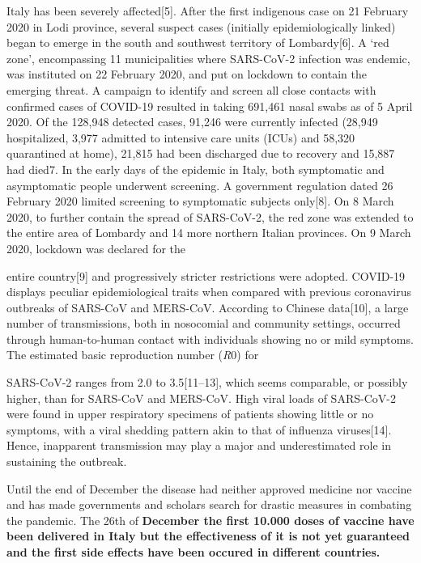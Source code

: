 \documentclass[a4paper]{article}
\begin{document}
\textcolor[rgb]{0.07450981,0.078431375,0.07450981}{Italy has been severely affected[5]. After the first indigenous case
on 21 February 2020 in Lodi province, several suspect cases (initially epidemiologically linked) began to emerge in the
south and southwest territory of Lombardy[6]. A ‘red zone’, encompassing 11 municipalities where SARS-CoV-2 infection
was endemic, was instituted on 22 February 2020, and put on lockdown to contain the emerging threat. A campaign to
identify and screen all close contacts with confirmed cases of COVID-19 resulted in taking 691,461 nasal swabs as of 5
April 2020. Of the 128,948 detected cases, 91,246 were currently infected (28,949 hospitalized, 3,977 admitted to
intensive care units (ICUs) and 58,320 quarantined at home), 21,815 had been discharged due to recovery and 15,887 had
died7. In the early days of the epidemic in Italy, both symptomatic and asymptomatic people underwent screening. A
government regulation dated 26 February 2020 limited screening to symptomatic subjects only[8]. On 8 March 2020, to
further contain the spread of SARS-CoV-2, the red zone was extended to the entire area of Lombardy and 14 more northern
Italian provinces. On 9 March 2020, lockdown was declared for the}

\textcolor[rgb]{0.07450981,0.078431375,0.07450981}{entire country[9] and progressively stricter restrictions were
adopted. COVID-19 displays peculiar epidemiological traits when compared with previous coronavirus outbreaks of
SARS-CoV and }\textcolor[rgb]{0.07450981,0.078431375,0.07450981}{MERS-CoV. According to Chinese data[10], a large
number of transmissions, both in nosocomial and community settings, occurred through human-to-human contact with
individuals showing no or mild symptoms. The estimated basic reproduction number
(}\textit{\textcolor[rgb]{0.07450981,0.078431375,0.07450981}{R}}\textcolor[rgb]{0.07450981,0.078431375,0.07450981}{0)
for}

\textcolor[rgb]{0.07450981,0.078431375,0.07450981}{SARS-CoV-2 ranges from 2.0 to 3.5[11–13], which seems comparable, or
possibly higher, than for SARS-CoV and MERS-CoV. High viral loads of SARS-CoV-2 were found in upper respiratory
specimens of patients showing little or no symptoms, with a viral shedding pattern akin to that of influenza
viruses[14]. Hence, inapparent transmission may play a major and underestimated role in sustaining the outbreak.}

\textcolor[rgb]{0.07450981,0.078431375,0.07450981}{Until the end of December the disease had neither approved medicine
nor vaccine and has made governments and scholars search for drastic measures in combating the pandemic. The 26th of
}\textbf{\textcolor[rgb]{0.07450981,0.078431375,0.07450981}{December the first 10.000 doses of vaccine have been
delivered in Italy but the effectiveness of it is not yet guaranteed and the first side effects have been occured in
different countries.}}
\end{document}
